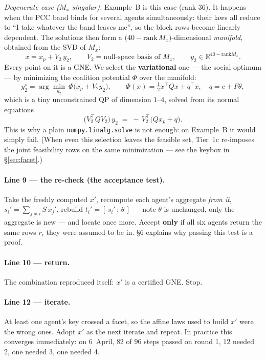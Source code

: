 \documentclass[11pt, letterpaper]{article}
\begin{document}
\smallskip
\emph{Degenerate case ($M_x$ singular).} Example~B is this case (rank $36$). It happens when the PCC
band binds for several agents simultaneously: their laws all reduce to ``I take whatever the band
leaves me'', so the block rows become linearly dependent. The solutions then form a
$\bigl(40-\mathrm{rank}\,M_x\bigr)$-dimensional \emph{manifold}, obtained from the SVD of $M_x$:
\[
  x = x_p + V_2\,y_2,\qquad V_2=\text{null-space basis of }M_x,\qquad y_2\in\mathbb R^{40-\mathrm{rank}M_x}.
\]
Every point on it is a GNE. We select the \textbf{variational} one --- the social optimum --- by
minimizing the coalition potential $\Phi$ over the manifold:
\[
  y_2^\star=\arg\min_{y_2}\ \Phi\bigl(x_p+V_2y_2\bigr),\qquad
  \Phi(x)=\tfrac12x^\top Qx+q^\top x,\quad q=c+F\theta,
\]
which is a tiny unconstrained QP of dimension $1$--$4$, solved from its normal equations
\[
  \bigl(V_2^\top QV_2\bigr)\,y_2 \;=\; -\,V_2^\top\bigl(Qx_p+q\bigr).
\]
This is why a plain \texttt{numpy.linalg.solve} is not enough: on Example~B it would simply fail.
(When even this selection leaves the feasible set, Tier~1c re-imposes the joint feasibility rows on
the same minimization --- see the keybox in \S\ref{sec:facet}.)

\paragraph{Line 9 --- the re-check (the acceptance test).}
Take the freshly computed $x'$, recompute each agent's aggregate \emph{from it},
$s_i'=\sum_{j\ne i}S\,x_j'$, rebuild $t_i'=[\,s_i'\,;\,\theta\,]$ --- note $\theta$ is unchanged, only
the aggregate is new --- and locate once more. Accept \textbf{only} if all six agents return the same
rows $r_i$ they were assumed to be in. \S6 explains why passing this test is a proof.

\paragraph{Line 10 --- return.} The combination reproduced itself: $x'$ is a certified GNE. Stop.

\paragraph{Line 12 --- iterate.} At least one agent's key crossed a facet, so the affine laws used to
build $x'$ were the wrong ones. Adopt $x'$ as the next iterate and repeat. In practice this
converges immediately: on 6~April, $82$ of $96$ steps passed on round 1, $12$ needed 2, one needed 3,
one needed 4.
\end{document}
